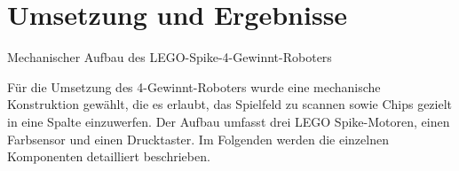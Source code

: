 \chapter{Umsetzung und Ergebnisse}
\label{cha:umsetzung}




Mechanischer Aufbau des LEGO-Spike-4-Gewinnt-Roboters


Für die Umsetzung des 4-Gewinnt-Roboters wurde eine mechanische Konstruktion gewählt, die es erlaubt, das Spielfeld zu scannen sowie Chips gezielt in eine Spalte einzuwerfen. Der Aufbau umfasst drei LEGO Spike-Motoren, einen Farbsensor und einen Drucktaster. Im Folgenden werden die einzelnen Komponenten detailliert beschrieben.

